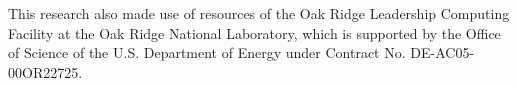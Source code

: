 This research also made use of resources of the Oak Ridge Leadership Computing Facility at the Oak Ridge National Laboratory, which is supported by the Office of Science of the U.S. Department of Energy under Contract No. DE-AC05-00OR22725.